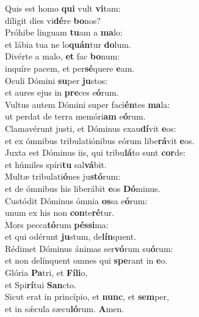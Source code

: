 \evenverse Quis est homo \textbf{qui} vult \textbf{vi}tam:~\*\\
\evenverse díligit dies vi\textbf{dé}re \textbf{bo}nos?\\
\oddverse Próhibe linguam \textbf{tu}am a \textbf{ma}lo:~\*\\
\oddverse et lábia tua ne lo\textbf{quán}tur \textbf{do}lum.\\
\evenverse Divérte a malo, \textbf{et} fac \textbf{bo}num:~\*\\
\evenverse inquíre pacem, et per\textbf{sé}quere \textbf{e}am.\\
\oddverse Oculi Dómini \textbf{su}per \textbf{ju}stos:~\*\\
\oddverse et aures ejus in \textbf{pre}ces e\textbf{ó}rum.\\
\evenverse Vultus autem Dómini super faci\textbf{én}tes \textbf{ma}la:~\*\\
\evenverse ut perdat de terra memóri\textbf{am} e\textbf{ó}rum.\\
\oddverse Clamavérunt justi, et Dóminus exau\textbf{dí}vit \textbf{e}os:~\*\\
\oddverse et ex ómnibus tribulatiónibus eórum libe\textbf{rá}vit \textbf{e}os.\\
\evenverse Juxta est Dóminus iis, qui tribu\textbf{lá}to sunt \textbf{cor}de:~\*\\
\evenverse et húmiles spíri\textbf{tu} sal\textbf{vá}bit.\\
\oddverse Multæ tribulati\textbf{ó}nes ju\textbf{stó}rum:~\*\\
\oddverse et de ómnibus his liberábit \textbf{e}os \textbf{Dó}minus.\\
\evenverse Custódit Dóminus ómnia \textbf{os}sa e\textbf{ó}rum:~\*\\
\evenverse unum ex his non \textbf{con}te\textbf{ré}tur.\\
\oddverse Mors pecca\textbf{tó}rum \textbf{pés}\textbf{si}ma:~\*\\
\oddverse et qui odérunt \textbf{ju}stum, de\textbf{lín}quent.\\
\evenverse Rédimet Dóminus ánimas ser\textbf{vó}rum su\textbf{ó}rum:~\*\\
\evenverse et non delínquent omnes qui \textbf{spe}rant in \textbf{e}o.\\
\oddverse Glória \textbf{Pa}tri, et \textbf{Fí}\textbf{li}o,~\*\\
\oddverse et Spi\textbf{rí}tui \textbf{San}cto.\\
\evenverse Sicut erat in princípio, et \textbf{nunc}, et \textbf{sem}per,~\*\\
\evenverse et in sǽcula sæcu\textbf{ló}rum. \textbf{A}men.\\

